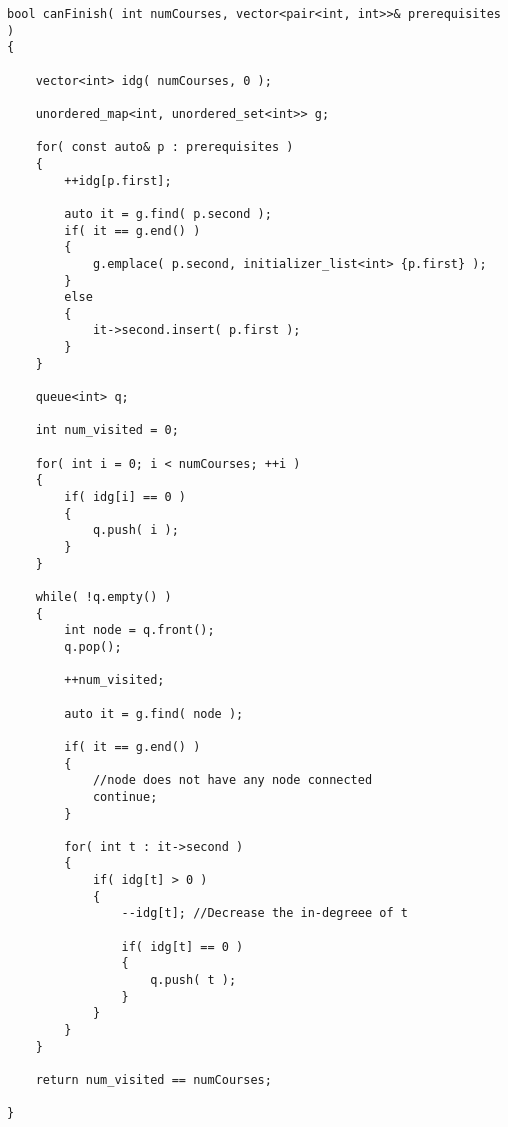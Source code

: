 \setcounter{lstlisting}{0}
\begin{lstlisting}[style=customc, caption={BFS}]
bool canFinish( int numCourses, vector<pair<int, int>>& prerequisites )
{

    vector<int> idg( numCourses, 0 );

    unordered_map<int, unordered_set<int>> g;

    for( const auto& p : prerequisites )
    {
        ++idg[p.first];

        auto it = g.find( p.second );
        if( it == g.end() )
        {
            g.emplace( p.second, initializer_list<int> {p.first} );
        }
        else
        {
            it->second.insert( p.first );
        }
    }

    queue<int> q;

    int num_visited = 0;

    for( int i = 0; i < numCourses; ++i )
    {
        if( idg[i] == 0 )
        {
            q.push( i );
        }
    }

    while( !q.empty() )
    {
        int node = q.front();
        q.pop();

        ++num_visited;

        auto it = g.find( node );

        if( it == g.end() )
        {
            //node does not have any node connected
            continue;
        }

        for( int t : it->second )
        {
            if( idg[t] > 0 )
            {
                --idg[t]; //Decrease the in-degreee of t

                if( idg[t] == 0 )
                {
                    q.push( t );
                }
            }
        }
    }

    return num_visited == numCourses;

}
\end{lstlisting}